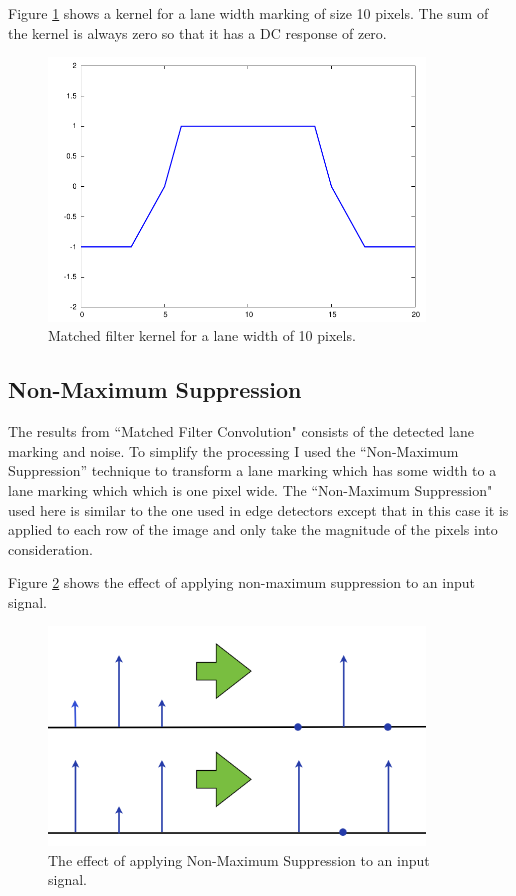 Figure \ref{fig:kernel} shows a kernel for a lane width marking of size 10 
pixels. The sum of the kernel is always zero so that it has a DC response of 
zero. 
\begin{figure}
\centering
\includegraphics[width=100mm]{figures/kernel}
\caption{Matched filter kernel for a lane width of 10 pixels.}
\label{fig:kernel}
\end{figure}

\subsection{Non-Maximum Suppression}
The results from ``Matched Filter Convolution" consists of the detected lane 
marking and noise. To simplify the processing I used the ``Non-Maximum 
Suppression'' technique to transform a lane marking which has some width to a 
lane marking which which is one pixel wide. The ``Non-Maximum Suppression" used 
here is similar to the one used in edge detectors except that in this case it is 
applied to each row of the image and only take the magnitude of the pixels into 
consideration. 

Figure \ref{fig:non_maxima} shows the effect of applying non-maximum suppression 
to an input signal. 

\begin{figure}
\centering
\includegraphics[width=100mm]{figures/non_maxima_suppression.png}
\caption{The effect of applying Non-Maximum Suppression to an input signal.}
\label{fig:non_maxima}
\end{figure}

